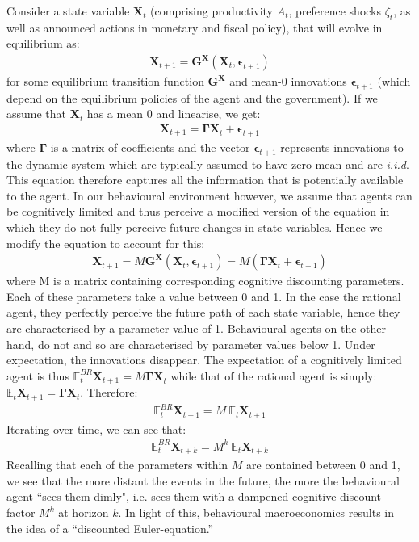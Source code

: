 \documentclass[11pt]{article}
\newcommand{\bb}{\bigbreak\noindent}
\begin{document}
\begin{spacing}{2}
\bb
Consider a state variable $\boldsymbol{X}_t$ (comprising productivity $A_t$, preference shocks $\zeta_t$, as well as announced actions in monetary and fiscal policy), that will evolve in equilibrium as:
\begin{align}
	\boldsymbol{X}_{t+1} = \boldsymbol{G^X}(\boldsymbol{X}_t, \boldsymbol{\epsilon}_{t+1})
\end{align} 
for some equilibrium transition function $\boldsymbol{G^X}$ and mean-0 innovations $\boldsymbol{\epsilon}_{t+1}$ (which depend on the equilibrium policies of the agent and the government). If we assume that $\boldsymbol{X}_t$ has a mean 0 and linearise, we get:
\begin{align}
	\boldsymbol{X}_{t+1} = \boldsymbol{\Gamma X}_t + \boldsymbol{\epsilon}_{t+1}
\end{align}
where $\boldsymbol{\Gamma}$ is a matrix of coefficients and the vector $\boldsymbol{\epsilon}_{t+1}$ represents innovations to the dynamic system which are typically assumed to have zero mean and are \textit{i.i.d}. This equation therefore captures all the information that is potentially available to the agent. 
\bb
In our behavioural environment however, we assume that agents can be cognitively limited and thus perceive a modified version of the equation in which they do not fully perceive future changes in state variables. Hence we modify the equation to account for this:
\begin{align}
	\boldsymbol{X}_{t+1} = M\boldsymbol{G^X}(\boldsymbol{X}_t, \boldsymbol{\epsilon}_{t+1}) = M(\boldsymbol{\Gamma X}_t + \boldsymbol{\epsilon}_{t+1})
\end{align}
where M is a matrix containing corresponding cognitive discounting parameters. Each of these parameters take a value between 0 and 1. In the case the rational agent, they perfectly perceive the future path of each state variable, hence they are characterised by a parameter value of 1. Behavioural agents on the other hand, do not and so are characterised by parameter values below 1. 
Under expectation, the innovations disappear. The expectation of a cognitively limited agent is thus $ \mathbb{E}_t^{BR} \boldsymbol{X}_{t+1} = M\boldsymbol{\Gamma X}_t $ while that of the rational agent is simply:  $\mathbb{E}_t \boldsymbol{X}_{t+1} = \boldsymbol{\Gamma X}_t $. Therefore:
\begin{align}
	\label{eq:lemma}
	 \mathbb{E}_t^{BR} \boldsymbol{X}_{t+1} = M \:\mathbb{E}_t \boldsymbol{X}_{t+1}
\end{align}
Iterating over time, we can see that:
\begin{align}
	\mathbb{E}_t^{BR} \boldsymbol{X}_{t+k} = M^k \:\mathbb{E}_t \boldsymbol{X}_{t+k}
\end{align}
Recalling that each of the parameters within $M$ are contained between 0 and 1, we see that the more distant the events in the future, the more the behavioural agent ``sees them dimly", i.e. sees them with a dampened cognitive discount factor $M^k$ at horizon $k$. In light of this, behavioural macroeconomics results in the idea of a ``discounted Euler-equation.''


\end{spacing}
\end{document}
